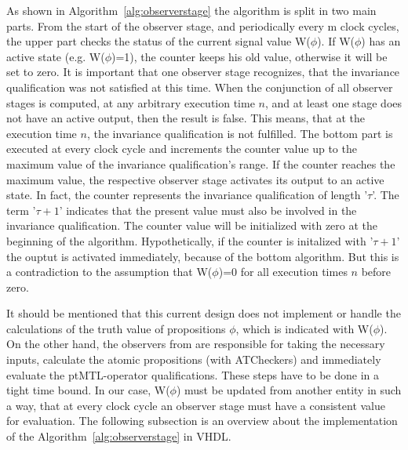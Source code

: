 As shown in Algorithm~\ref{alg:observerstage} the algorithm is split in two main parts. 
From the start of the observer stage, and periodically every m clock cycles, 
the upper part checks the status of the current signal value W($\phi$). If W($\phi$) has an active state (e.g. W($\phi$)=1), the counter keeps his old value, otherwise it will be set to zero. 
It is important that one observer stage recognizes, that the invariance qualification was not satisfied
at this time. When the conjunction of all observer stages is computed, at any arbitrary execution time $n$, and at least one stage does not have an active output, 
then the result is false. This means, that at the execution time $n$, the invariance qualification is not fulfilled. 
The bottom part is executed at every clock cycle and increments the counter value up to the maximum value of the invariance qualification's range. 
If the counter reaches the maximum value, the respective observer stage activates its output to an active state. In fact, the counter represents the invariance qualification of length
'$\tau$'. The term '$\tau + 1$' indicates that the present value must also be involved in the invariance qualification. 
The counter value will be initialized with zero at the beginning of the algorithm. 
Hypothetically, if the counter is initalized with '$\tau + 1$' the ouptut is activated immediately, because
of the bottom algorithm. But this is a contradiction to the assumption that  W($\phi$)=0 for all execution times $n$ before zero. 

It should be mentioned that this current design does not implement or handle the calculations of the truth value of propositions $\phi$,  
which is indicated with W($\phi$). On the other hand, the observers from \cite{RTFMBJ13} are responsible for taking the necessary inputs, 
calculate the atomic propositions (with ATCheckers) and immediately evaluate the ptMTL-operator qualifications. 
These steps have to be done in a tight time bound. 
In our case, W($\phi$) must be updated from another entity in such a way, that at every clock cycle an observer stage must have a consistent value for evaluation. 
The following subsection is an overview about the implementation of the Algorithm~\ref{alg:observerstage} in VHDL. 

